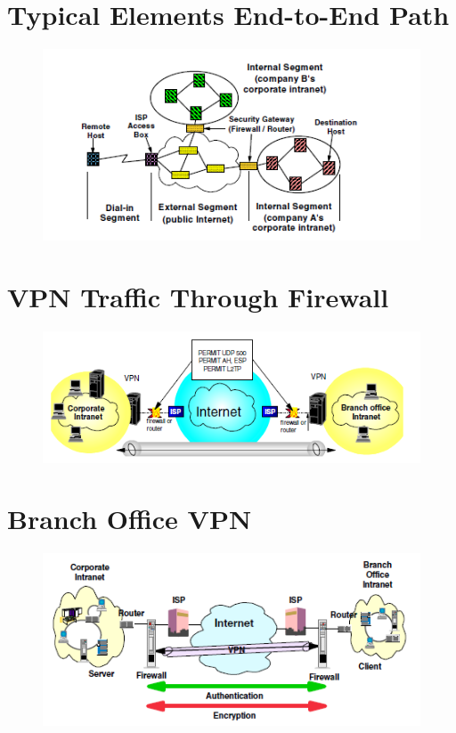 \documentclass[10pt,a4paper]{article}
\author{Austin Vern Songer}
\begin{document}
\tableofcontents
\newpage
\section{Typical Elements End-to-End Path}

\begin{figure}[hbtp]
\centering
\includegraphics[scale=1]{TypicalElementsEnd-To-End-Path.png}
\end{figure}

\newpage
\section{VPN Traffic Through Firewall}

\begin{figure}[hbtp]
\centering
\includegraphics[scale=1]{VPN-Traffic-Through-FireWall.png}
\end{figure}

\newpage
\section{Branch Office VPN}

\begin{figure}[hbtp]
\centering
\includegraphics[scale=1]{Branch Office VPN.png}
\end{figure}
\end{document}
